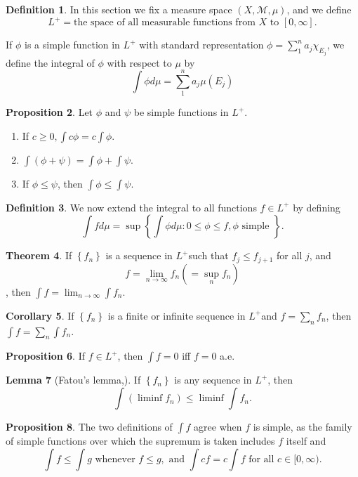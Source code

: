 \documentclass[12pt,a4paper]{book}
\newenvironment{enu}{\begin{enumerate}[(1)]}{\end{enumerate}}
\theoremstyle{definition}
\newtheorem{defn}{Definition}[section]
\newtheorem{coro}[defn]{Corollary}
\newtheorem{theo}[defn]{Theorem}
\newtheorem{lem}[defn]{Lemma}
\newtheorem{prop}[defn]{Proposition}
\begin{document}
\begin{defn}
    In this section we fix a measure space $(X, \mathcal{M}, \mu)$, and we define
    $$
        L^{+}=\text {the space of all measurable functions from } X \text { to }[0, \infty] .
    $$

    If $\phi$ is a simple function in $L^{+}$
    with standard representation $\phi=\sum_1^n a_j \chi_{E_j}$, we define the integral of $\phi$ with respect to $\mu$ by
    $$
        \int \phi d \mu=\sum_1^n a_j \mu\left(E_j\right)
    $$
\end{defn}
\begin{prop}
    Let $\phi$ and $\psi$ be simple functions in $L^{+}$.
    \begin{enu}
        \item If $c \geq 0, \int c \phi=c \int \phi$.
        \item $\int(\phi+\psi)=\int \phi+\int \psi$.
        \item If $\phi \leq \psi$, then $\int \phi \leq \int \psi$.
    \end{enu}
\end{prop}
\begin{defn}
    We now extend the integral to all functions $f \in L^{+}$ 
    by defining
    $$
        \int f d \mu=\sup \left\{\int \phi d \mu: 0 \leq \phi \leq f, \phi \text { simple }\right\} .
    $$
\end{defn}
\begin{theo}
    If $\left\{f_n\right\}$ is a sequence in $L^{+}$such that $f_j \leq f_{j+1}$ for all $j$, and $$f=\lim _{n \rightarrow \infty} f_n\left(=\sup _n f_n\right)$$, then $\int f=\lim _{n \rightarrow \infty} \int f_n$.
\end{theo}
\begin{coro}
    If $\left\{f_n\right\}$ is a finite or infinite sequence in $L^{+}$and $f=\sum_n f_n$, then $\int f=\sum_n \int f_n$.
\end{coro}
\begin{prop}
    If $f \in L^{+}$, then $\int f=0$ iff $f=0$ a.e.
\end{prop}
\begin{lem}[Fatou's lemma,]
    If $\left\{f_n\right\}$ is any sequence in $L^{+}$, then
    $$
        \int\left(\liminf f_n\right) \leq \liminf \int f_n .
    $$
\end{lem}
\begin{prop}
    The two definitions of $\int f$ agree when $f$ is simple, as the family of simple functions over which the supremum is taken includes $f$ itself and
    $$
        \int f \leq \int g \text { whenever } f \leq g, \text { and } \int c f=c \int f \text { for all } c \in[0, \infty) .
    $$
\end{prop}
\end{document}
